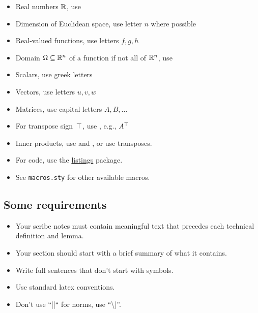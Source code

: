 \documentclass[12pt]{article}
\begin{document}
\begin{itemize}
\item Real numbers $\mathbb{R}$, use 
\item Dimension of Euclidean space, use letter $n$ where possible
\item Real-valued functions, use letters $f, g, h$
\item Domain $\Omega\subseteq\mathbb{R}^n$ of a function if not all of $\mathbb{R}^n$, use 
\item Scalars, use greek letters
\item Vectors, use letters $u, v, w$
\item Matrices, use capital letters $A, B, \dots$
\item For transpose sign~$\top$, use , e.g., $A^\top$
\item Inner products, use  and , or use transposes.
\item For code, use the \href{https://en.wikibooks.org/wiki/LaTeX/Source_Code_Listings}{listings} package.
\item See {\tt macros.sty} for other available macros.
\end{itemize}

\subsection{Some requirements}

\begin{itemize}
\item Your scribe notes must contain meaningful text that precedes each
technical definition and lemma.
\item Your section should start with a brief summary of what it contains.
\item Write full sentences that don't start with symbols.
\item Use standard latex conventions.
\item Don't use ``||`` for norms, use ``\textbackslash |''.
\end{itemize}
\end{document}
